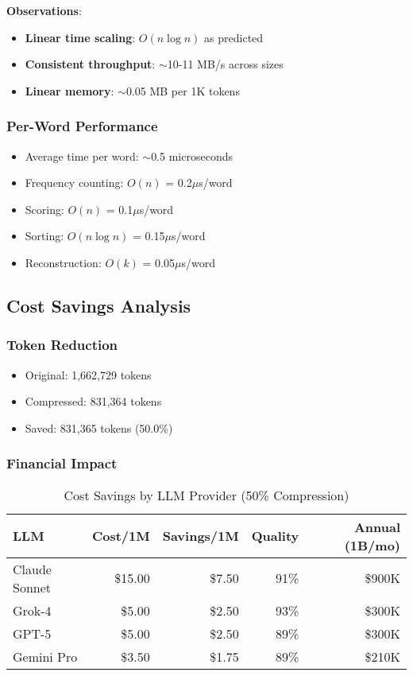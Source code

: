 \textbf{Observations}:
\begin{itemize}
    \item \textbf{Linear time scaling}: $O(n \log n)$ as predicted
    \item \textbf{Consistent throughput}: $\sim$10-11 MB/s across sizes
    \item \textbf{Linear memory}: $\sim$0.05 MB per 1K tokens
\end{itemize}

\subsubsection{Per-Word Performance}

\begin{itemize}
    \item Average time per word: $\sim$0.5 microseconds
    \item Frequency counting: $O(n)$ = 0.2$\mu$s/word
    \item Scoring: $O(n)$ = 0.1$\mu$s/word
    \item Sorting: $O(n \log n)$ = 0.15$\mu$s/word
    \item Reconstruction: $O(k)$ = 0.05$\mu$s/word
\end{itemize}

\subsection{Cost Savings Analysis}

\subsubsection{Token Reduction}

\begin{itemize}
    \item Original: 1,662,729 tokens
    \item Compressed: 831,364 tokens
    \item Saved: 831,365 tokens (50.0\%)
\end{itemize}

\subsubsection{Financial Impact}

\begin{table}[h]
\centering
\caption{Cost Savings by LLM Provider (50\% Compression)}
\label{tab:cost-savings}
\begin{tabular}{lrrrr}
\toprule
LLM & Cost/1M & Savings/1M & Quality & Annual (1B/mo) \\
\midrule
Claude Sonnet & \$15.00 & \$7.50 & 91\% & \$900K \\
Grok-4 & \$5.00 & \$2.50 & 93\% & \$300K \\
GPT-5 & \$5.00 & \$2.50 & 89\% & \$300K \\
Gemini Pro & \$3.50 & \$1.75 & 89\% & \$210K \\
\bottomrule
\end{tabular}
\end{table}

